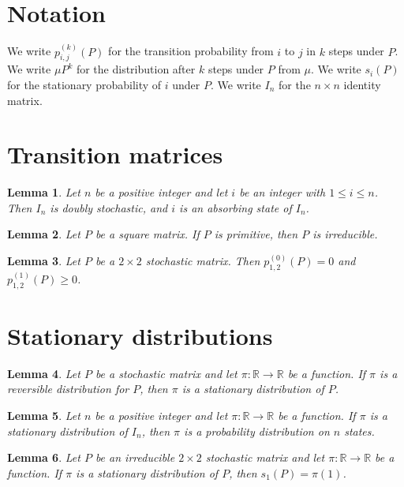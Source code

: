 \documentclass{article}
\newtheorem{lemma}{Lemma}
\begin{document}
\section{Notation}

We write $p^{(k)}_{i,j}(P)$ for the transition probability from $i$ to $j$ in $k$ steps under $P$.
We write $\mu P^k$ for the distribution after $k$ steps under $P$ from $\mu$.
We write $s_i(P)$ for the stationary probability of $i$ under $P$.
We write $I_n$ for the $n\times n$ identity matrix.

\section{Transition matrices}

\begin{lemma}\label{identity}
Let $n$ be a positive integer and let $i$ be an integer with $1\le i\le n$. Then $I_n$ is doubly stochastic, and $i$ is an absorbing state of $I_n$.
\end{lemma}

\begin{lemma}\label{primitive}
Let $P$ be a square matrix. If $P$ is primitive, then $P$ is irreducible.
\end{lemma}

\begin{lemma}\label{steps}
Let $P$ be a $2\times2$ stochastic matrix. Then $p^{(0)}_{1,2}(P)=0$ and $p^{(1)}_{1,2}(P)\ge0$.
\end{lemma}

\section{Stationary distributions}

\begin{lemma}\label{reversible}
Let $P$ be a stochastic matrix and let $\pi:\mathbb{R}\to\mathbb{R}$ be a function. If $\pi$ is a reversible distribution for $P$, then $\pi$ is a stationary distribution of $P$.
\end{lemma}

\begin{lemma}\label{uniform}
Let $n$ be a positive integer and let $\pi:\mathbb{R}\to\mathbb{R}$ be a function. If $\pi$ is a stationary distribution of $I_n$, then $\pi$ is a probability distribution on $n$ states.
\end{lemma}

\begin{lemma}\label{unique}
Let $P$ be an irreducible $2\times2$ stochastic matrix and let $\pi:\mathbb{R}\to\mathbb{R}$ be a function. If $\pi$ is a stationary distribution of $P$, then $s_1(P)=\pi(1)$.
\end{lemma}
\end{document}
